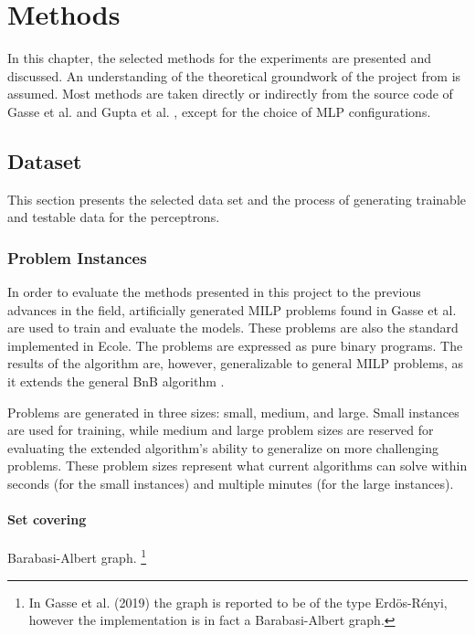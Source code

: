 \chapter{Methods}\label{cha:methods}

In this chapter, the selected methods for the experiments are presented and discussed.  
An understanding of the theoretical groundwork of the project from  is assumed. Most methods are taken directly or indirectly from the source code of Gasse et al. \cite{gasse2019exact} and Gupta et al. \cite{gupta2020hybrid}, except for the choice of \gls{MLP} configurations.


\section{Dataset}\label{sec:dataset}

This section presents the selected data set and the process of generating trainable and testable data for the perceptrons. 


\subsection{Problem Instances}\label{ssec:probleminstances}

In order to evaluate the methods presented in this project to the previous advances in the field, artificially generated \gls{MILP} problems found in Gasse et al. \cite{gasse2019exact} are used to train and evaluate the models. These problems are also the standard implemented in \gls{Ecole}.
The problems are expressed as pure binary programs. The results of the algorithm are, however, generalizable to general \gls{MILP} problems, as it extends the general \gls{BnB} algorithm \cite{gasse2019exact}. 

Problems are generated in three sizes: small, medium, and large. Small instances are used for training, while medium and large problem sizes are reserved for evaluating the extended algorithm's ability to generalize on more challenging problems. These problem sizes represent what current algorithms can solve within seconds (for the small instances) and multiple minutes (for the large instances).


\subsubsection{Set covering}

Barabasi-Albert graph.
\footnote{In Gasse et al. (2019) the graph is reported to be of the type Erd\"{o}s-R\'{e}nyi, however the implementation is in fact a Barabasi-Albert graph.}

